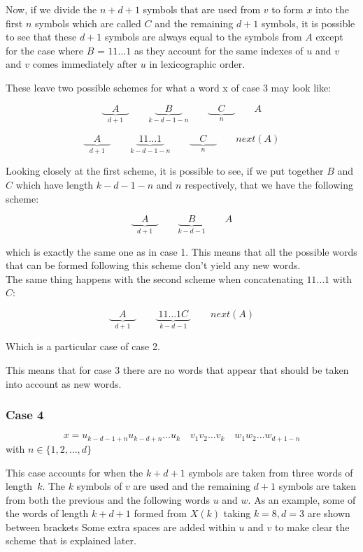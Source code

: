 \documentclass[11pt,a4paper]{tesis}
\begin{document}
Now, if we divide the $n + d + 1$ symbols that are used from $v$ to form $x$ into the first $n$ symbols which are called $C$ and the remaining $d + 1$ symbols, it is possible to see that these $d + 1$ symbols are always equal to the symbols from $A$ except for the case where $B$ = $11\dots1$ as they account for the same indexes of $u$ and $v$ and $v$ comes immediately after $u$ in lexicographic order. 


These leave two possible schemes for what a word x of case 3 may look like:

$$\underbrace{\quad A \quad }_{d +1} \qquad \underbrace{\quad B \quad }_{k - d - 1 - n}  \qquad \underbrace{\quad C \quad }_{n} \qquad A$$

$$\underbrace{\quad A \quad }_{d +1} \qquad \underbrace{\; 11\dots1 \; }_{k - d - 1 - n}  \qquad \underbrace{\quad C \quad }_{n} \qquad next(A)$$

Looking closely at the first scheme, it is possible to see, if we put together $B$ and $C$ which have length $k - d - 1 - n$ and $n$ respectively, that we have the following scheme:

$$\underbrace{\quad A \quad }_{d +1} \qquad \underbrace{\quad B \quad }_{k - d - 1}  \qquad A$$

which is exactly the same one as in case 1. This means that all the possible words that can be formed following this scheme don't yield any new words.
\\
The same thing happens with the second scheme when concatenating $11\dots1$ with $C$:

$$\underbrace{\quad A \quad }_{d +1} \qquad \underbrace{\; 11\dots1C \; }_{k - d - 1}  \qquad next(A)$$

Which is a particular case of case 2.

This means that for case 3 there are no words that appear that should be taken into account as new words.


\subsubsection{Case 4}
$$ x = u_{k-d-1+n} u_{k-d+n} \dots u_k \quad v_1 v_2 \dots v_k \quad w_1 w_2 \dots w_{d+1-n}$$
with $n \in \{1, 2, \dots , d\}$

This case accounts for when the $k + d + 1$ symbols are taken from three words of length~$k$. The $k$ symbols of $v$ are used and the remaining $d + 1$ symbols are taken from both the previous and the following words $u$ and $w$.
As an example, some of the words of length $k + d + 1$ formed from $X(k)$ taking $k = 8, d = 3$ are shown between brackets
Some extra spaces are added within $u$ and $v$ to make clear the scheme that is explained later.
\end{document}
